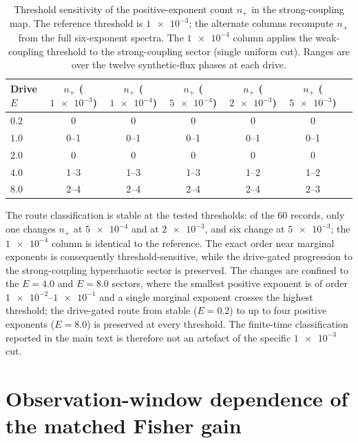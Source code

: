 \documentclass[Phys]{SciPost}
\begin{document}
\begin{table}[h]
  \centering
  \caption{Threshold sensitivity of the positive-exponent count $n_{+}$ in the
  strong-coupling map. The reference threshold is $\num{1e-3}$; the alternate
  columns recompute $n_{+}$ from the full six-exponent spectra. The
  $\num{1e-4}$ column applies the weak-coupling threshold to the strong-coupling
  sector (single uniform cut). Ranges are over the twelve synthetic-flux phases
  at each drive.}
  \label{SI-tab:si-threshold-sensitivity}
  \small
  \setlength{\tabcolsep}{4pt}
  \begin{tabular}{@{}lcccccc@{}}
    \toprule
    Drive $E$ & $n_{+}$ ($\num{1e-3}$) & $n_{+}$ ($\num{1e-4}$) & $n_{+}$ ($\num{5e-4}$) & $n_{+}$ ($\num{2e-3}$) & $n_{+}$ ($\num{5e-3}$) \\
    \midrule
    $\num{0.2}$ & 0 & 0 & 0 & 0 & 0 \\
    $\num{1.0}$ & 0--1 & 0--1 & 0--1 & 0--1 & 0--1 \\
    $\num{2.0}$ & 0 & 0 & 0 & 0 & 0 \\
    $\num{4.0}$ & 1--3 & 1--3 & 1--3 & 1--2 & 1--2 \\
    $\num{8.0}$ & 2--4 & 2--4 & 2--4 & 2--4 & 2--3 \\
    \bottomrule
  \end{tabular}
\end{table}

The route classification is stable at the tested thresholds: of the 60
records, only one changes $n_{+}$ at $\num{5e-4}$ and at $\num{2e-3}$, and six
change at $\num{5e-3}$; the $\num{1e-4}$ column is identical to the reference.
The exact order near marginal exponents is consequently threshold-sensitive,
while the drive-gated progression to the strong-coupling hyperchaotic sector
is preserved. The changes are confined to the $E=\num{4.0}$ and $E=\num{8.0}$ sectors,
where the smallest positive exponent is of order $\num{1e-2}$--$\num{1e-1}$ and a
single marginal exponent crosses the highest threshold; the drive-gated route
from stable ($E=\num{0.2}$) to up to four positive exponents ($E=\num{8.0}$) is preserved at
every threshold. The finite-time classification reported in the main text is
therefore not an artefact of the specific $\num{1e-3}$ cut.

\section{Observation-window dependence of the matched Fisher gain}
\label{SI-sec:fisher-window}
\label{SI-sec:fisher-window}
\end{document}
